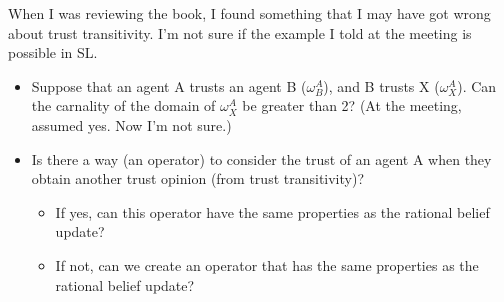 \documentclass[a4paper,12pt]{article}
\theoremstyle{definition}
\numberwithin{equation}{section}
\begin{document}
When I was reviewing the book, I found something that I may have got wrong about trust transitivity. I'm not sure if the example I told at the meeting is possible in SL.

\begin{itemize}
	\item Suppose that an agent A trusts an agent B ($\omega^A_B$), and B trusts X ($\omega^A_X$). Can the carnality of the domain of $\omega^A_X$ be greater than 2? (At the meeting, assumed yes. Now I'm not sure.)
	
	\item Is there a way (an operator) to consider the trust of an agent A when they obtain another trust opinion (from trust transitivity)?
	
	\begin{itemize}
		\item If yes, can this operator have the same properties as the rational belief update?
		
		\item If not, can we create an operator that has the same properties as the rational belief update?
	\end{itemize}
\end{itemize}


%
%
\end{document}

